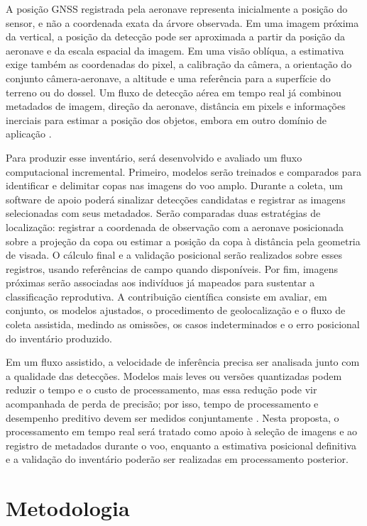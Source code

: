 A posição GNSS registrada pela aeronave representa inicialmente a posição do sensor, e não a coordenada exata da árvore observada. Em uma imagem próxima da vertical, a posição da detecção pode ser aproximada a partir da posição da aeronave e da escala espacial da imagem. Em uma visão oblíqua, a estimativa exige também as coordenadas do pixel, a calibração da câmera, a orientação do conjunto câmera-aeronave, a altitude e uma referência para a superfície do terreno ou do dossel. Um fluxo de detecção aérea em tempo real já combinou metadados de imagem, direção da aeronave, distância em pixels e informações inerciais para estimar a posição dos objetos, embora em outro domínio de aplicação \citep{lago2024}.

Para produzir esse inventário, será desenvolvido e avaliado um fluxo computacional incremental. Primeiro, modelos serão treinados e comparados para identificar e delimitar copas nas imagens do voo amplo. Durante a coleta, um software de apoio poderá sinalizar detecções candidatas e registrar as imagens selecionadas com seus metadados. Serão comparadas duas estratégias de localização: registrar a coordenada de observação com a aeronave posicionada sobre a projeção da copa ou estimar a posição da copa à distância pela geometria de visada. O cálculo final e a validação posicional serão realizados sobre esses registros, usando referências de campo quando disponíveis. Por fim, imagens próximas serão associadas aos indivíduos já mapeados para sustentar a classificação reprodutiva. A contribuição científica consiste em avaliar, em conjunto, os modelos ajustados, o procedimento de geolocalização e o fluxo de coleta assistida, medindo as omissões, os casos indeterminados e o erro posicional do inventário produzido.

Em um fluxo assistido, a velocidade de inferência precisa ser analisada junto com a qualidade das detecções. Modelos mais leves ou versões quantizadas podem reduzir o tempo e o custo de processamento, mas essa redução pode vir acompanhada de perda de precisão; por isso, tempo de processamento e desempenho preditivo devem ser medidos conjuntamente \citep{lago2024}. Nesta proposta, o processamento em tempo real será tratado como apoio à seleção de imagens e ao registro de metadados durante o voo, enquanto a estimativa posicional definitiva e a validação do inventário poderão ser realizadas em processamento posterior.

\section{Metodologia}


